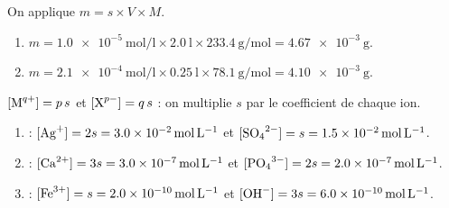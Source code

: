 \documentclass[11pt,a4paper]{article}
\begin{document}
\begin{corrige}
On applique $m = s\times V\times M$.
\begin{enumerate}[label=\alph*)]
  \item $m = \qty{1.0e-5}{\mole\per\litre}\times\qty{2.0}{\litre}\times\qty{233.4}{\gram\per\mole}
           = \qty{4.67e-3}{\gram}$.
  \item $m = \qty{2.1e-4}{\mole\per\litre}\times\qty{0.25}{\litre}\times\qty{78.1}{\gram\per\mole}
           = \qty{4.10e-3}{\gram}$.
\end{enumerate}
\end{corrige}

\begin{corrige}
$[\ce{M^{q+}}]=p\,s$ et $[\ce{X^{p-}}]=q\,s$ : on multiplie $s$ par le coefficient de chaque ion.
\begin{enumerate}[label=\alph*)]
  \item {} : $[\ce{Ag+}]=2s=\qty{3.0e-2}{\mole\per\litre}$ et
        $[\ce{SO4^{2-}}]=s=\qty{1.5e-2}{\mole\per\litre}$.
  \item {} : $[\ce{Ca^{2+}}]=3s=\qty{3.0e-7}{\mole\per\litre}$ et
        $[\ce{PO4^{3-}}]=2s=\qty{2.0e-7}{\mole\per\litre}$.
  \item {} : $[\ce{Fe^{3+}}]=s=\qty{2.0e-10}{\mole\per\litre}$ et
        $[\ce{OH-}]=3s=\qty{6.0e-10}{\mole\per\litre}$.
\end{enumerate}
\end{corrige}
\end{document}
